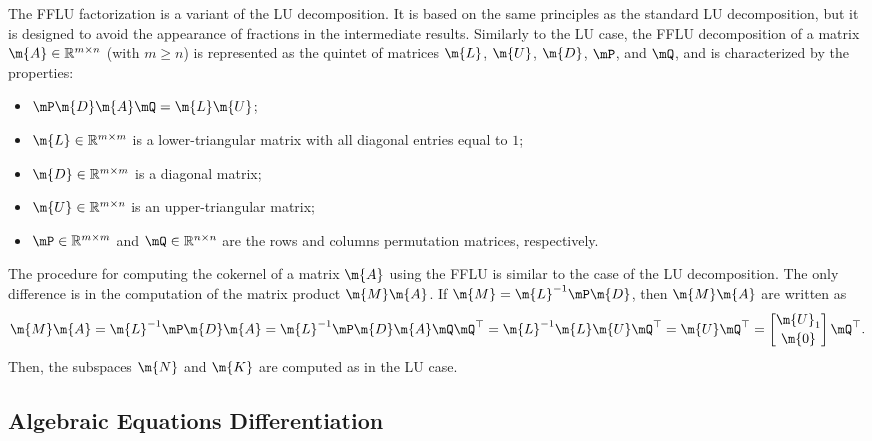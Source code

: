 The \ac{FFLU} factorization is a variant of the \ac{LU} decomposition. It is based on the same principles as the standard \ac{LU} decomposition, but it is designed to avoid the appearance of fractions in the intermediate results. Similarly to the \ac{LU} case, the \ac{FFLU} decomposition of a matrix $\m{A} \in \mathbb{R}^{m \times n}$ (with $m\geq n$) is represented as the quintet of matrices $\m{L}$, $\m{U}$, $\m{D}$, $\mP$, and $\mQ$, and is characterized by the properties:
%
\begin{itemize}
  \setlength{\itemsep}{0.0em}
  \item $\mP\m{D}\m{A}\mQ = \m{L}\m{U}$;
  \item $\m{L} \in \mathbb{R}^{m \times m}$ is a lower-triangular matrix with all diagonal entries equal to $1$;
  \item $\m{D} \in \mathbb{R}^{m \times m}$ is a diagonal matrix;
  \item $\m{U} \in \mathbb{R}^{m \times n}$ is an upper-triangular matrix;
  \item $\mP \in \mathbb{R}^{m \times m}$ and $\mQ \in \mathbb{R}^{n \times n}$ are the rows and columns permutation matrices, respectively.
\end{itemize}
%
The procedure for computing the cokernel of a matrix $\m{A}$ using the \ac{FFLU} is similar to the case of the \ac{LU} decomposition. The only difference is in the computation of the matrix product $\m{M}\m{A}$. If $\m{M} = \m{L}^{-1}\mP\m{D}$, then $\m{M}\m{A}$ are written as
%
\begin{equation}
  \m{M}\m{A}
  = \m{L}^{-1}\mP\m{D}\m{A}
  = \m{L}^{-1}\mP\m{D}\m{A}\mQ\mQ^\top
  = \m{L}^{-1}\m{L}\m{U}\mQ^\top
  = \m{U}\mQ^\top = \begin{bmatrix} \m{U}_1 \\[0.2em] \m{0} \end{bmatrix}\mQ^\top \text{.}
\end{equation}
%
Then, the subspaces $\m{N}$ and $\m{K}$ are computed as in the \ac{LU} case.

\subsection{Algebraic Equations Differentiation}
\label{chap3:sec:differentiation}

